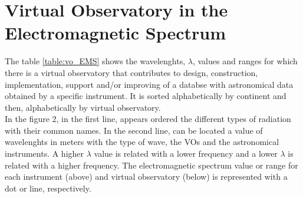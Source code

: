 \section{Virtual Observatory in the Electromagnetic Spectrum}
The table \ref{table:vo_EMS} shows the wavelenghts, $ \lambda $, values and
ranges for which there is a virtual observatory that contributes to design,
construction, implementation, support and/or improving of a databse with
astronomical data obtained by a specific instrument. It is sorted alphabetically
by continent and then, alphabetically by virtual observatory.\\

In the figure 2, in the first line, appears ordered the different types of
radiation with their common names. In the second line, can be located a value of
wavelenghts in meters with the type of wave, the VOs and the astronomical
instruments. A higher $ \lambda $ value is related with a lower frequency and a
lower $ \lambda $ is related with a higher frequency. The electromagnetic
spectrum value or range for each instrument (above) and virtual observatory
(below) is represented with a dot or line, respectively.\\

